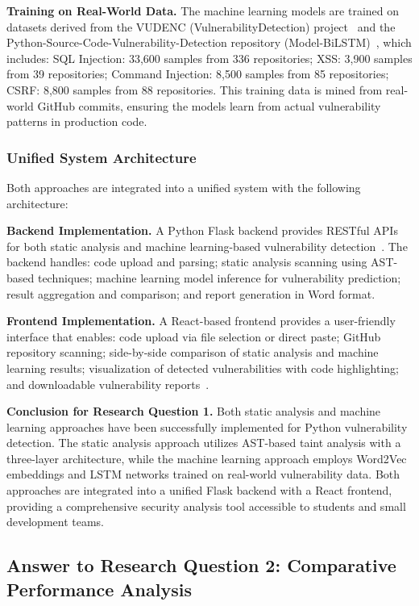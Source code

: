 \textbf{Training on Real-World Data.}
The machine learning models are trained on datasets derived from the VUDENC (VulnerabilityDetection) project~\cite{VulnDetection} and the Python-Source-Code-Vulnerability-Detection repository (Model-BiLSTM)~\cite{PythonVulnDetectionDataset}, which includes: SQL Injection: 33,600 samples from 336 repositories; XSS: 3,900 samples from 39 repositories; Command Injection: 8,500 samples from 85 repositories; CSRF: 8,800 samples from 88 repositories. This training data is mined from real-world GitHub commits, ensuring the models learn from actual vulnerability patterns in production code.

\subsubsection{Unified System Architecture}
\label{sec:unified_architecture}

Both approaches are integrated into a unified system with the following architecture:

\textbf{Backend Implementation.}
A Python Flask backend provides RESTful APIs for both static analysis and machine learning-based vulnerability detection~\cite{AlmasiToolRepo}. The backend handles: code upload and parsing; static analysis scanning using AST-based techniques; machine learning model inference for vulnerability prediction; result aggregation and comparison; and report generation in Word format.

\textbf{Frontend Implementation.}
A React-based frontend provides a user-friendly interface that enables: code upload via file selection or direct paste; GitHub repository scanning; side-by-side comparison of static analysis and machine learning results; visualization of detected vulnerabilities with code highlighting; and downloadable vulnerability reports~\cite{AlmasiDeployedApp}.

\textbf{Conclusion for Research Question 1.}
Both static analysis and machine learning approaches have been successfully implemented for Python vulnerability detection. The static analysis approach utilizes AST-based taint analysis with a three-layer architecture, while the machine learning approach employs Word2Vec embeddings and LSTM networks trained on real-world vulnerability data. Both approaches are integrated into a unified Flask backend with a React frontend, providing a comprehensive security analysis tool accessible to students and small development teams.

\subsection{Answer to Research Question 2: Comparative Performance Analysis}
\label{sec:answer_rq2}

